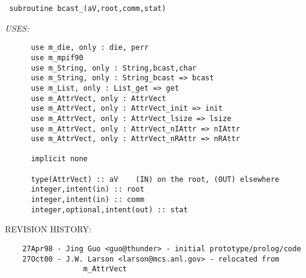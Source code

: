 \begin{verbatim} 
 subroutine bcast_(aV,root,comm,stat)\end{verbatim}{\em USES:}
\begin{verbatim}      use m_die, only : die, perr
      use m_mpif90
      use m_String, only : String,bcast,char
      use m_String, only : String_bcast => bcast
      use m_List, only : List_get => get
      use m_AttrVect, only : AttrVect
      use m_AttrVect, only : AttrVect_init => init
      use m_AttrVect, only : AttrVect_lsize => lsize
      use m_AttrVect, only : AttrVect_nIAttr => nIAttr
      use m_AttrVect, only : AttrVect_nRAttr => nRAttr
 
      implicit none
 
      type(AttrVect) :: aV	  (IN) on the root, (OUT) elsewhere
      integer,intent(in) :: root
      integer,intent(in) :: comm
      integer,optional,intent(out) :: stat
 \end{verbatim}{\sf REVISION HISTORY:}
\begin{verbatim}  	27Apr98 - Jing Guo <guo@thunder> - initial prototype/prolog/code
  	27Oct00 - J.W. Larson <larson@mcs.anl.gov> - relocated from
                  m_AttrVect\end{verbatim}

